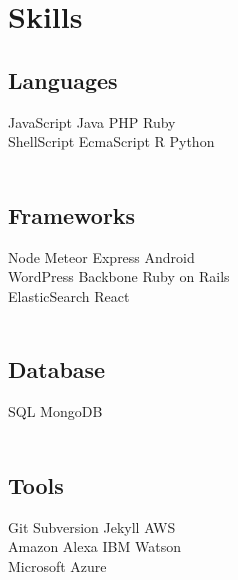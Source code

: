 \documentclass[]{deedy-resume-openfont}
\begin{document}
\begin{minipage}[t]{0.33\textwidth}

\section{Skills}
\subsection{Languages}
JavaScript \textbullet{} Java \textbullet{} PHP \textbullet{} Ruby \\ ShellScript \textbullet{} EcmaScript \textbullet{} R \textbullet{} Python \\~\\
\subsection{Frameworks}
Node \textbullet{} Meteor \textbullet{} Express \textbullet{} Android \\ WordPress \textbullet{} Backbone \textbullet{} Ruby on Rails \\ ElasticSearch \textbullet{} React \\~\\
\subsection{Database}
SQL \textbullet{} MongoDB \\~\\
\subsection{Tools}
Git \textbullet{} Subversion \textbullet{} Jekyll \textbullet{} AWS \\ Amazon Alexa \textbullet{} IBM Watson \\
Microsoft Azure
\sectionsep




\end{minipage}
\end{document}
